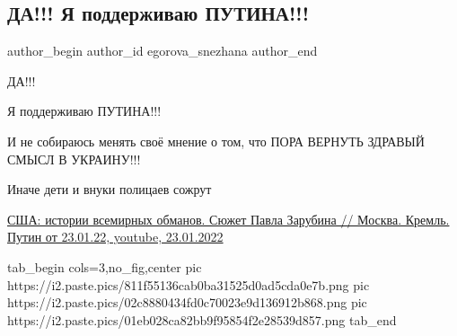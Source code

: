  
 
 
 
 
 
\subsection{ДА!!! Я поддерживаю ПУТИНА!!!}
\label{sec:26_01_2022.fb.egorova_snezhana.1.putin}
 
\ifcmt
 author_begin
   author_id egorova_snezhana
 author_end
\fi

ДА!!!

Я поддерживаю ПУТИНА!!!

И не собираюсь менять своё мнение о том, что ПОРА ВЕРНУТЬ ЗДРАВЫЙ СМЫСЛ В
УКРАИНУ!!!

Иначе дети и внуки полицаев сожрут

\href{https://www.youtube.com/watch?v=ICSNYz2WsS8}{%
США: истории всемирных обманов. Сюжет Павла Зарубина // Москва. Кремль. Путин от 23.01.22, youtube, 23.01.2022%
}

\ifcmt
  tab_begin cols=3,no_fig,center
     pic https://i2.paste.pics/811f55136cab0ba31525d0ad5cda0e7b.png
		 pic https://i2.paste.pics/02c8880434fd0c70023e9d136912b868.png
		 pic https://i2.paste.pics/01eb028ca82bb9f95854f2e28539d857.png
  tab_end
\fi

